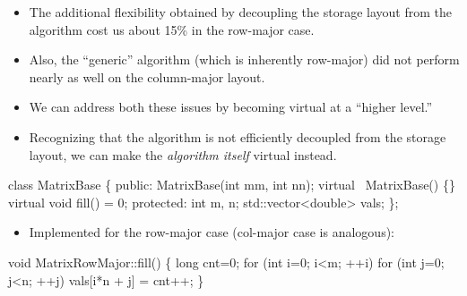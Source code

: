 \begin{frame}
  \begin{itemize}
    \itemsep=1cm
  \item {The additional flexibility obtained by decoupling the storage
      layout from the algorithm cost us about 15\% in the row-major case.}

  \item {Also, the ``generic'' algorithm (which is inherently 
      row-major) did not perform nearly as well on the column-major
      layout.}


    \item {We can address both these issues by becoming virtual at a ``higher level.''}
  \end{itemize}
\end{frame}



\begin{frame}[fragile]
  \begin{itemize}
    \itemsep=1cm
  \item {Recognizing that the algorithm is not efficiently decoupled from
      the storage layout, we can make the \emph{algorithm itself} virtual instead.}
  \end{itemize}
\small
  \begin{semiverbatim}
class MatrixBase
\{
public:
  MatrixBase(int mm, int nn);
  virtual ~MatrixBase() \{\}
  \alert{virtual void fill() = 0;}
protected:
  int m, n;
  std::vector<double> vals;
\};
\end{semiverbatim}
\end{frame}


\begin{frame}[fragile]
  \begin{itemize}
  \item {Implemented for the row-major case (col-major case
      is analogous):}
  \end{itemize}
\small
\begin{semiverbatim}
void MatrixRowMajor::fill()
\{
  long cnt=0;
  for (int i=0; i<m; ++i)
    for (int j=0; j<n; ++j)
      vals[i*n + j] = cnt++;
\}
\end{semiverbatim}
\end{frame}


